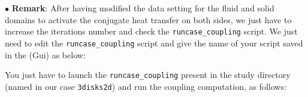 $\bullet$ {\bf Remark}: After having modified the data setting for the fluid
and solid domains to activate the conjugate heat transfer on both sides,
we just have to increase the iterations number and check the \texttt{runcase\_coupling} script.
\newpage
We just need to edit the \texttt{runcase\_coupling} script and give the name of your \syrthes
script saved in the \syrthes (Gui) as below: \\

You just have to launch the \texttt{runcase\_coupling} present
in the study directory (named in our case \texttt{3disks2d})
and run the coupling computation, as follows:    \\

